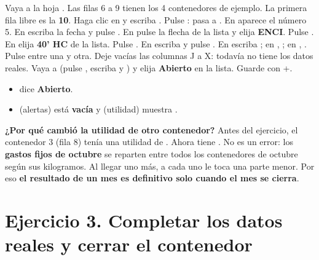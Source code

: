 \begin{pasos}
\paso Vaya a la hoja . Las filas 6 a 9 tienen los 4 contenedores de ejemplo. La primera fila libre es la \textbf{10}.
\paso Haga clic en  y escriba . Pulse : pasa a . En  aparece el número 5.
\paso En  escriba la fecha  y pulse .
\paso En  pulse la flecha de la lista y elija \textbf{ENCI}. Pulse .
\paso En  elija \textbf{40' HC} de la lista. Pulse .
\paso En  escriba  y pulse .
\paso En  escriba ; en , ; en , . Pulse  entre una y otra.
\paso Deje vacías las columnas J a X: todavía no tiene los datos reales.
\paso Vaya a  (pulse , escriba  y ) y elija \textbf{Abierto} en la lista.
\paso Guarde con +.
\end{pasos}


\begin{resultado}
\begin{itemize}
  \item {}  dice \textbf{Abierto}.
  \item {}  (alertas) está \textbf{vacía} y  (utilidad) muestra \textbf{\vEjDosUAI}.
\end{itemize}
\end{resultado}

\begin{nota}
\textbf{¿Por qué cambió la utilidad de otro contenedor?} Antes del ejercicio, el contenedor 3 (fila 8) tenía una utilidad de \vUAIcTres.
Ahora tiene \vEjDosUAItres. No es un error: los \textbf{gastos fijos de octubre} se reparten entre todos los contenedores de octubre según
sus kilogramos. Al llegar uno más, a cada uno le toca una parte menor. Por eso \textbf{el resultado de un mes es definitivo solo cuando el
mes se cierra}.
\end{nota}

\section{Ejercicio 3. Completar los datos reales y cerrar el contenedor}\label{sec:ej3}

